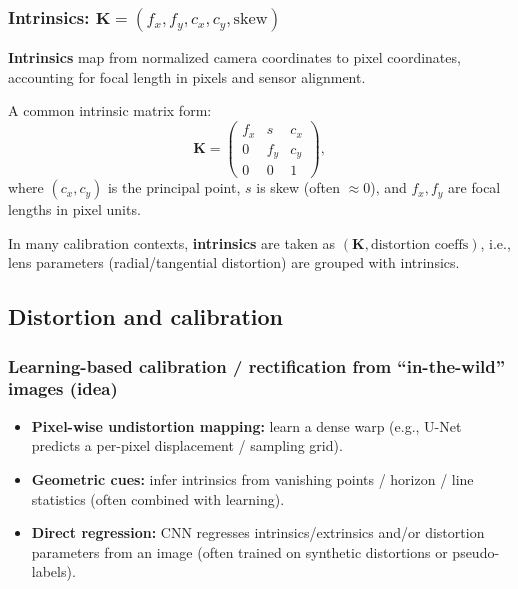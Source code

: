 \documentclass[11pt,a4paper]{article}
\newcommand{\mat}[1]{\mathbf{#1}}
\begin{document}
\subsubsection{Intrinsics: $\mat{K}=(f_x,f_y,c_x,c_y,\text{skew})$}

\begin{defbox}
\textbf{Intrinsics} map from normalized camera coordinates to pixel coordinates, accounting for focal length in pixels
and sensor alignment.
\end{defbox}

\begin{mathrule}
A common intrinsic matrix form:
\[
\mat{K}=
\begin{pmatrix}
f_x & s   & c_x\\
0   & f_y & c_y\\
0   & 0   & 1
\end{pmatrix},
\]
where $(c_x,c_y)$ is the principal point, $s$ is skew (often $\approx 0$), and $f_x,f_y$ are focal lengths in pixel units.
\end{mathrule}

\begin{notebox}
In many calibration contexts, \textbf{intrinsics} are taken as $(\mat{K},\text{distortion coeffs})$, i.e., lens parameters (radial/tangential distortion) are grouped with intrinsics.
\end{notebox}

\subsection{Distortion and calibration}

\subsubsection{Learning-based calibration / rectification from ``in-the-wild'' images (idea)}
\begin{itemize}
  \item \textbf{Pixel-wise undistortion mapping:} learn a dense warp (e.g., U-Net predicts a per-pixel displacement / sampling grid).
  \item \textbf{Geometric cues:} infer intrinsics from vanishing points / horizon / line statistics (often combined with learning).
  \item \textbf{Direct regression:} CNN regresses intrinsics/extrinsics and/or distortion parameters from an image (often trained on synthetic distortions or pseudo-labels).
\end{itemize}
\end{document}
